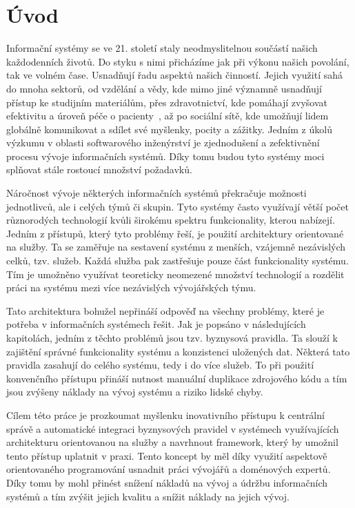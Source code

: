 
\chapter{Úvod}\label{ch:uvod}

Informační systémy se ve 21. století staly neodmyslitelnou součástí našich každodenních životů.
Do styku s nimi přicházíme jak při výkonu našich povolání, tak ve volném čase. Usnadňují
řadu aspektů našich činností. Jejich využití sahá do mnoha sektorů, od vzdělání a vědy,
kde mimo jiné významně usnadňují přístup ke studijním materiálům, přes zdravotnictví,
kde pomáhají zvyšovat efektivitu a úroveň péče o pacienty~\cite{fichman2011editorial}, až po
sociální sítě, kde umožňují lidem globálně komunikovat a sdílet své myšlenky, pocity a zážitky.
Jedním z úkolů výzkumu v oblasti softwarového inženýrství je zjednodušení a zefektivnění procesu
vývoje informačních systémů. Díky tomu budou tyto systémy moci splňovat stále rostoucí množství požadavků.

Náročnost vývoje některých informačních systémů překračuje možnosti jednotlivců, ale
i celých týmů či skupin. Tyto systémy často využívají větší počet různorodých technologií kvůli
širokému spektru funkcionality, kterou nabízejí. Jedním z přístupů, který tyto problémy řeší,
je použití architektury orientované na služby. Ta se zaměřuje na sestavení systému z menších, vzájemně
nezávislých celků, tzv. služeb. Každá služba pak zastřešuje pouze část funkcionality systému.
Tím je umožněno využívat teoreticky neomezené množství technologií a rozdělit práci na systému mezi více nezávislých
vývojářských týmu.

Tato architektura bohužel nepřináší odpověď na všechny problémy, které je potřeba v informačních
systémech řešit. Jak je popsáno v následujících kapitolách, jedním z těchto problémů jsou tzv. byznysová
pravidla. Ta slouží k zajištění správné funkcionality systému a konzistenci uložených dat.
Některá tato pravidla zasahují do celého systému, tedy i do více služeb.
To při použití konvenčního přístupu přináší nutnost manuální duplikace zdrojového
kódu a tím jsou zvýšeny náklady na vývoj systému a riziko lidské chyby.

Cílem této práce je prozkoumat myšlenku inovativního přístupu k centrální správě a automatické
integraci byznysových pravidel v systémech využívajících architekturu orientovanou na služby
a navrhnout framework, který by umožnil tento přístup uplatnit v praxi.
Tento koncept by měl díky využití aspektově orientovaného programování usnadnit práci vývojářů
a doménových expertů. Díky tomu by mohl přinést snížení nákladů na vývoj a údržbu informačních systémů
a tím zvýšit jejich kvalitu a snížit náklady na jejich vývoj.

